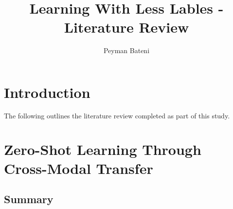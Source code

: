 \documentclass{article}
\title{Learning With Less Lables - Literature Review}
\author{Peyman Bateni}
\begin{document}
\maketitle

\section{Introduction}
The following outlines the literature review completed as part of this study.

\section{Zero-Shot Learning Through Cross-Modal Transfer \cite{Socher:2013:ZLT:2999611.2999716}}
\subsection{Summary}
\end{document}
